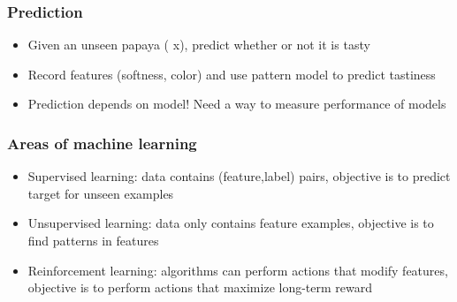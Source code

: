 \documentclass[10pt]{beamer}
\begin{document}
\begin{frame}
  \frametitle{Prediction}
  \vspace*{0.5cm}
  \begin{center}
  \end{center}
  \vspace*{1.5cm}
  \begin{itemize}
	\item Given an unseen papaya ({\color{orange} \textsf x}), {\color{blue} predict} whether or not it is tasty
	\item Record features (softness, color) and use pattern model to predict tastiness 
	\item Prediction depends on model! Need a way to measure {\color{purple} performance} of models
  \end{itemize}
\end{frame}

\begin{frame}
  \frametitle{Areas of machine learning}
  \begin{itemize}
	\item {\color{red} Supervised learning}: data contains (feature,label) pairs, objective is to predict target for unseen examples
	\item {\color{red} Unsupervised learning}: data only contains feature examples, objective is to find patterns in features
	\item {\color{red} Reinforcement learning}: algorithms can perform {\color{blue} actions} that modify features, objective is to perform actions that maximize long-term {\color{green} reward}
  \end{itemize}
\end{frame}
\end{document}
